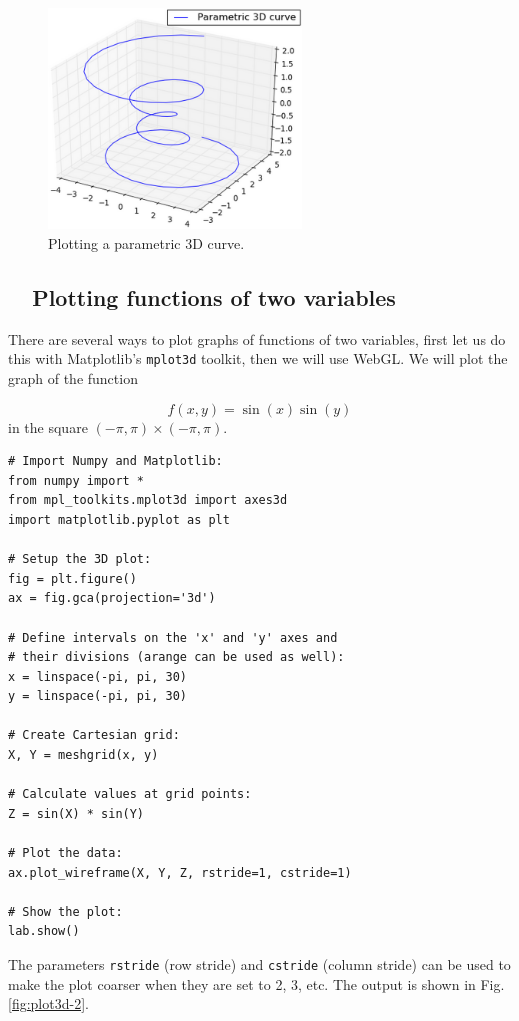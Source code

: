 \begin{figure}[!ht]
\begin{center}
\includegraphics[width=0.6\textwidth]{imgp/plot3d-1.png}
\end{center}
\vspace{-4mm}
\caption{Plotting a parametric 3D curve.}
\label{fig:plot3d-1}
\end{figure}


\subsection{\ \ Plotting functions of two variables}

There are several ways to plot graphs of functions of two variables, 
first let us do this with Matplotlib's {\tt mplot3d} toolkit, then we will
use WebGL. We will plot the graph of the function 

$$
  f(x, y) = \sin(x) \sin(y)
$$
in the square $(-\pi, \pi) \times (-\pi, \pi)$.

\begin{verbatim}
# Import Numpy and Matplotlib:
from numpy import *
from mpl_toolkits.mplot3d import axes3d
import matplotlib.pyplot as plt

# Setup the 3D plot:
fig = plt.figure()
ax = fig.gca(projection='3d')

# Define intervals on the 'x' and 'y' axes and 
# their divisions (arange can be used as well):
x = linspace(-pi, pi, 30)
y = linspace(-pi, pi, 30)

# Create Cartesian grid:
X, Y = meshgrid(x, y)

# Calculate values at grid points:
Z = sin(X) * sin(Y)

# Plot the data:
ax.plot_wireframe(X, Y, Z, rstride=1, cstride=1)

# Show the plot:
lab.show()
\end{verbatim}
The parameters {\tt rstride} (row stride) and {\tt cstride} (column stride)
can be used to make the plot coarser when they are set to 2, 3, etc.
The output is shown in Fig. \ref{fig:plot3d-2}.
\newpage

